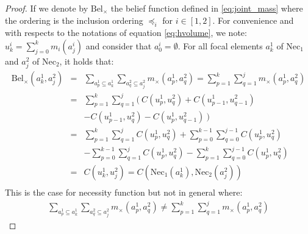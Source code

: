 \begin{proof}
    If we denote by $\mathrm{Bel}_\times$ the belief function defined in \eqref{eq:joint_mass} where the ordering is the inclusion ordering $\preceq_i$ for $i\in[1,2]$. For convenience and with respects to the notations of equation \eqref{eq:hvolume}, we note: $u^i_k=\sum_{j=0}^{k}m_i(a_j^i)$ and consider that $a^i_0=\emptyset$.
    For all focal elements $a_k^1$ of $\mathrm{Nec}_1$ and $a^2_j$ of $\mathrm{Nec}_2$, it holds that:
    \begin{eqnarray*}
        \mathrm{Bel}_\times(a^1_k, a^2_j) &=& \sum_{a^1_p\subseteq a_k^1}\sum_{a^2_q\subseteq a_j^2}m_\times(a^1_p, a^2_q) = \sum_{p=1}^k\sum_{q=1}^j m_\times(a^1_p, a^2_q)\\
        &=&\sum_{p=1}^k\sum_{q=1}^j (~C(u^1_p, u^2_q) + C(u^1_{p-1}, u^2_{q-1}) \\
        &&- C(u^1_{p-1}, u^2_{q}) - C(u^1_{p}, u^2_{q-1})~)\\
        &=&\sum_{p=1}^k\sum_{q=1}^jC(u^1_p, u^2_q) + \sum_{p=0}^{k-1}\sum_{q=0}^{j-1}C(u^1_p, u^2_q) \\
        &&- \sum_{p=0}^{k-1}\sum_{q=1}^jC(u^1_p, u^2_q) - \sum_{p=1}^k\sum_{q=0}^{j-1}C(u^1_p, u^2_q)\\
        &=& C(u^1_k, u^2_j) = C\left(\mathrm{Nec}_1(a_k^1), \mathrm{Nec}_2(a_j^2)\right)\\
    \end{eqnarray*}
    This is the case for necessity function but not in general where:
    \begin{align*}
        \sum_{a^1_p\subseteq a_k^1}\sum_{a^2_q\subseteq a_j^2}m_\times(a^1_p, a^2_q) \neq \sum_{p=1}^k\sum_{q=1}^j m_\times(a^1_p, a^2_q)
    \end{align*}
\end{proof}

